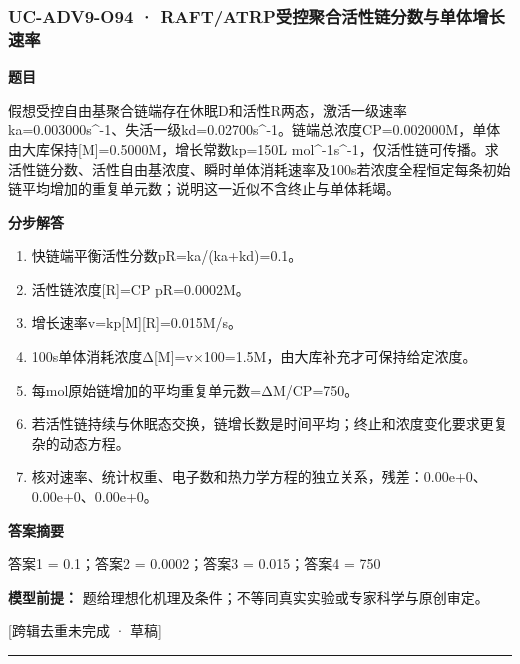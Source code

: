 \documentclass[UTF8,11pt,a4paper]{ctexart}
\begin{document}
\subsubsection*{UC-ADV9-O94 · RAFT/ATRP受控聚合活性链分数与单体增长速率}
\noindent\textbf{题目}\par
假想受控自由基聚合链端存在休眠D和活性R两态，激活一级速率ka=0.003000s\textasciicircum{}-1、失活一级kd=0.02700s\textasciicircum{}-1。链端总浓度CP=0.002000M，单体由大库保持[M]=0.5000M，增长常数kp=150L mol\textasciicircum{}-1s\textasciicircum{}-1，仅活性链可传播。求活性链分数、活性自由基浓度、瞬时单体消耗速率及100s若浓度全程恒定每条初始链平均增加的重复单元数；说明这一近似不含终止与单体耗竭。\par
\medskip\noindent\textbf{分步解答}
\begin{enumerate}
\item 快链端平衡活性分数pR=ka/(ka+kd)=0.1。
\item 活性链浓度[R]=CP pR=0.0002M。
\item 增长速率v=kp[M][R]=0.015M/s。
\item 100s单体消耗浓度Δ[M]=v×100=1.5M，由大库补充才可保持给定浓度。
\item 每mol原始链增加的平均重复单元数=ΔM/CP=750。
\item 若活性链持续与休眠态交换，链增长数是时间平均；终止和浓度变化要求更复杂的动态方程。
\item 核对速率、统计权重、电子数和热力学方程的独立关系，残差：0.00e+0、0.00e+0、0.00e+0。
\end{enumerate}
\noindent\textbf{答案摘要}\par
答案1 = 0.1；答案2 = 0.0002；答案3 = 0.015；答案4 = 750\par
\noindent\textbf{模型前提：}
题给理想化机理及条件；不等同真实实验或专家科学与原创审定。\par
\noindent\textcolor{red!65!black}{[跨辑去重未完成 · 草稿]} \par
\medskip\hrule\medskip
{}
\end{document}
